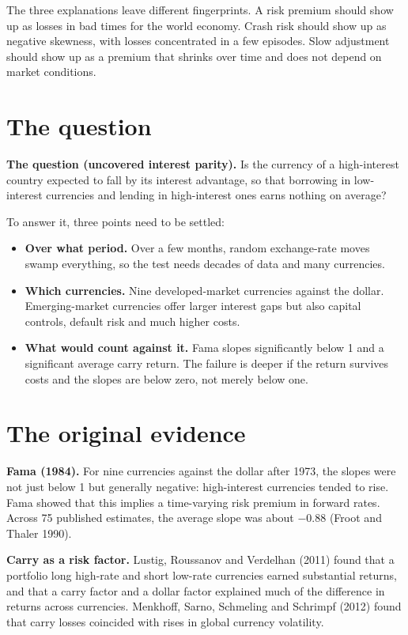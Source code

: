The three explanations leave different fingerprints. A risk premium should show up as losses in bad times for the world economy. Crash risk should show up as negative skewness, with losses concentrated in a few episodes. Slow adjustment should show up as a premium that shrinks over time and does not depend on market conditions.


\section{The question}
\label{sec:06-claim}

\begin{callout}
\textbf{The question (uncovered interest parity).} Is the currency of a high-interest country expected to fall by its interest advantage, so that borrowing in low-interest currencies and lending in high-interest ones earns nothing on average?
\end{callout}

To answer it, three points need to be settled:

\begin{itemize}
  \item \textbf{Over what period.} Over a few months, random exchange-rate moves swamp everything, so the test needs decades of data and many currencies.
  \item \textbf{Which currencies.} Nine developed-market currencies against the dollar. Emerging-market currencies offer larger interest gaps but also capital controls, default risk and much higher costs.
  \item \textbf{What would count against it.} Fama slopes significantly below 1 and a significant average carry return. The failure is deeper if the return survives costs and the slopes are below zero, not merely below one.
\end{itemize}

\section{The original evidence}
\label{sec:06-evidence}

\textbf{Fama (1984).} For nine currencies against the dollar after 1973, the slopes were not just below 1 but generally negative: high-interest currencies tended to rise. Fama showed that this implies a time-varying risk premium in forward rates. Across 75 published estimates, the average slope was about $-0.88$ (Froot and Thaler 1990).

\textbf{Carry as a risk factor.} Lustig, Roussanov and Verdelhan (2011) found that a portfolio long high-rate and short low-rate currencies earned substantial returns, and that a carry factor and a dollar factor explained much of the difference in returns across currencies. Menkhoff, Sarno, Schmeling and Schrimpf (2012) found that carry losses coincided with rises in global currency volatility.

